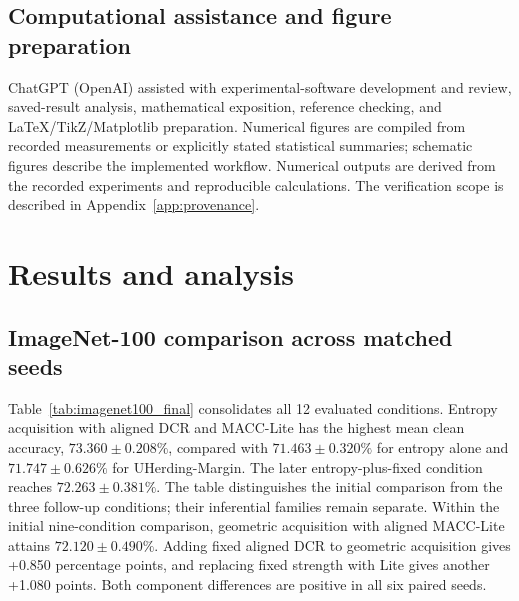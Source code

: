 \documentclass[a4paper,fleqn]{cas-dc}
\begin{document}
\subsection{Computational assistance and figure preparation}
\label{sec:computational_assistance}
ChatGPT (OpenAI) assisted with experimental-software development and
review, saved-result analysis, mathematical exposition, reference
checking, and LaTeX/TikZ/Matplotlib preparation. Numerical figures are
compiled from recorded measurements or explicitly stated statistical
summaries; schematic figures describe the implemented workflow.
Numerical outputs are derived from the recorded experiments and
reproducible calculations. The verification scope is described in
Appendix~\ref{app:provenance}.

\section{Results and analysis}\label{sec:results}

\subsection{ImageNet-100 comparison across matched seeds}

Table~\ref{tab:imagenet100_final} consolidates all 12 evaluated conditions.
Entropy acquisition with aligned DCR and MACC-Lite has the highest mean
clean accuracy, $73.360\pm0.208\%$, compared with
$71.463\pm0.320\%$ for entropy alone and $71.747\pm0.626\%$ for
UHerding-Margin. The later entropy-plus-fixed condition reaches
$72.263\pm0.381\%$. The table distinguishes the initial comparison from
the three follow-up conditions; their inferential families remain separate.
Within the initial nine-condition comparison, geometric acquisition with
aligned MACC-Lite attains $72.120\pm0.490\%$. Adding fixed aligned DCR to
geometric acquisition gives +0.850 percentage points, and replacing fixed
strength with Lite gives another +1.080 points. Both component differences
are positive in all six paired seeds.
\end{document}
